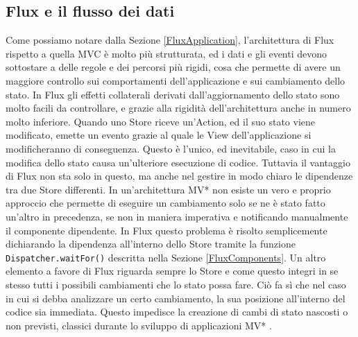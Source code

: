 \subsection{Flux e il flusso dei dati}
Come possiamo notare dalla Sezione \ref{FluxApplication}, l'architettura di Flux rispetto a quella MVC è molto più strutturata, ed i dati e gli eventi devono sottostare a delle regole e dei percorsi più rigidi, cosa che permette di avere un maggiore controllo sui comportamenti dell'applicazione e sui cambiamento dello stato. In Flux gli effetti collaterali derivati dall'aggiornamento dello stato sono molto facili da controllare, e grazie alla rigidità dell'architettura anche in numero molto inferiore. Quando uno Store riceve un'Action, ed il suo stato viene modificato, emette un evento grazie al quale le View dell'applicazione si modificheranno di conseguenza. Questo è l'unico, ed inevitabile, caso in cui la modifica dello stato causa un'ulteriore esecuzione di codice. 
Tuttavia il vantaggio di Flux non sta solo in questo, ma anche nel gestire in modo chiaro le dipendenze tra due Store differenti. In un'architettura MV* non esiste un vero e proprio approccio che permette di eseguire un cambiamento solo se ne è stato fatto un'altro in precedenza, se non in maniera imperativa e notificando manualmente il componente dipendente. In Flux questo problema è risolto semplicemente dichiarando la dipendenza all'interno dello Store tramite la funzione \texttt{Dispatcher.waitFor()} descritta nella Sezione \ref{FluxComponents}.
Un altro elemento a favore di Flux riguarda sempre lo Store e come questo integri in se stesso tutti i possibili cambiamenti che lo stato possa fare. Ciò fa sì che nel caso in cui si debba analizzare un certo cambiamento, la sua posizione all'interno del codice sia immediata. Questo impedisce la creazione di cambi di stato nascosti o non previsti, classici durante lo sviluppo di applicazioni MV* \cite{boduch2016flux}.

